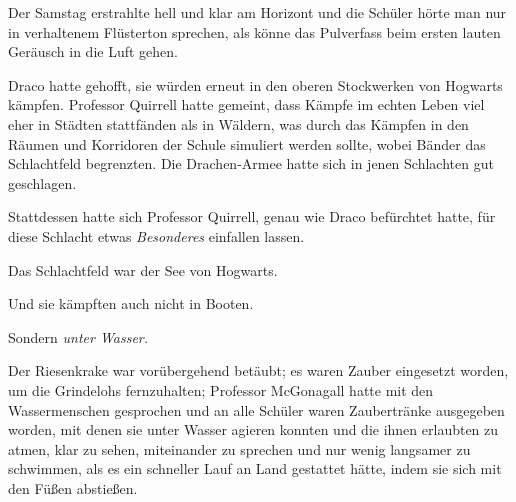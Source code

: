 Der Samstag erstrahlte hell und klar am Horizont und die Schüler hörte man nur in verhaltenem Flüsterton sprechen, als könne das Pulverfass beim ersten lauten Geräusch in die Luft gehen.

\later

Draco hatte gehofft, sie würden erneut in den oberen Stockwerken von Hogwarts kämpfen. Professor Quirrell hatte gemeint, dass Kämpfe im echten Leben viel eher in Städten stattfänden als in Wäldern, was durch das Kämpfen in den Räumen und Korridoren der Schule simuliert werden sollte, wobei Bänder das Schlachtfeld begrenzten. Die Drachen-Armee hatte sich in jenen Schlachten gut geschlagen.

Stattdessen hatte sich Professor Quirrell, genau wie Draco befürchtet hatte, für diese Schlacht etwas \emph{Besonderes} einfallen lassen.

Das Schlachtfeld war der See von Hogwarts.

Und sie kämpften auch nicht in Booten.

Sondern \emph{unter Wasser.}

Der Riesenkrake war vorübergehend betäubt; es waren Zauber eingesetzt worden, um die Grindelohs fernzuhalten; Professor McGonagall hatte mit den Wassermenschen gesprochen und an alle Schüler waren Zaubertränke ausgegeben worden, mit denen sie unter Wasser agieren konnten und die ihnen erlaubten zu atmen, klar zu sehen, miteinander zu sprechen und nur wenig langsamer zu schwimmen, als es ein schneller Lauf an Land gestattet hätte, indem sie sich mit den Füßen abstießen.

